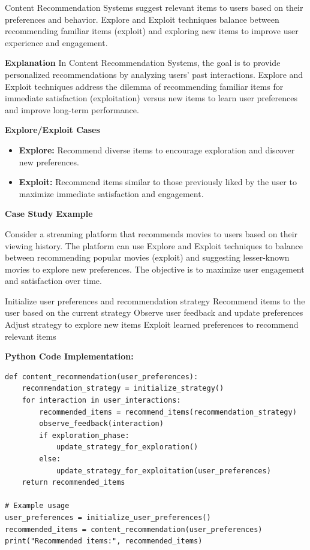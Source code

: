 \documentclass[12pt]{book} %
\begin{document}
Content Recommendation Systems suggest relevant items to users based on their preferences and behavior. Explore and Exploit techniques balance between recommending familiar items (exploit) and exploring new items to improve user experience and engagement.

\textbf{Explanation}
In Content Recommendation Systems, the goal is to provide personalized recommendations by analyzing users' past interactions. Explore and Exploit techniques address the dilemma of recommending familiar items for immediate satisfaction (exploitation) versus new items to learn user preferences and improve long-term performance.

\textbf{Explore/Exploit Cases}
\begin{itemize}
    \item \textbf{Explore:} Recommend diverse items to encourage exploration and discover new preferences.
    \item \textbf{Exploit:} Recommend items similar to those previously liked by the user to maximize immediate satisfaction and engagement.
\end{itemize}

\textbf{Case Study Example}

Consider a streaming platform that recommends movies to users based on their viewing history. The platform can use Explore and Exploit techniques to balance between recommending popular movies (exploit) and suggesting lesser-known movies to explore new preferences. The objective is to maximize user engagement and satisfaction over time.
\FloatBarrier
\begin{algorithm}
\caption{Explore-Exploit for Content Recommendation}
\begin{algorithmic}[1]
\State Initialize user preferences and recommendation strategy
    \State Recommend items to the user based on the current strategy
    \State Observe user feedback and update preferences
        \State Adjust strategy to explore new items
    \Else
        \State Exploit learned preferences to recommend relevant items
    \EndIf
\EndFor
\end{algorithmic}
\end{algorithm}
\FloatBarrier
\textbf{Python Code Implementation:}
\FloatBarrier
\begin{lstlisting}
def content_recommendation(user_preferences):
    recommendation_strategy = initialize_strategy()
    for interaction in user_interactions:
        recommended_items = recommend_items(recommendation_strategy)
        observe_feedback(interaction)
        if exploration_phase:
            update_strategy_for_exploration()
        else:
            update_strategy_for_exploitation(user_preferences)
    return recommended_items

# Example usage
user_preferences = initialize_user_preferences()
recommended_items = content_recommendation(user_preferences)
print("Recommended items:", recommended_items)
\end{lstlisting}
\FloatBarrier
\end{document}
